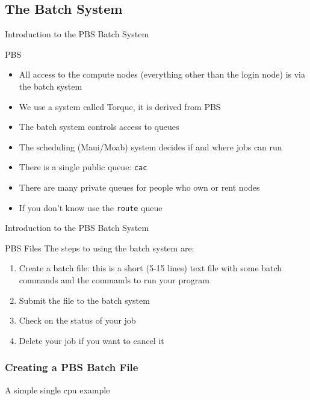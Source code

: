 \documentclass{beamer}
\begin{document}
  \subsection{The Batch System}
  \begin{frame}{Introduction to the PBS Batch System}
   \begin{block}{PBS}
    \begin{itemize}
    \item All access to the compute nodes (everything other than the login node)
      is via the batch system
    \item We use a system called Torque, it is derived from PBS
    \item The batch system controls access to queues
    \item The scheduling (Maui/Moab) system decides if and where jobs can run
    \item<2-> There is a single public queue: \texttt{cac}
    \item<2-> There are many private queues for people who own or rent nodes
    \item<2-> If you don't know use the \texttt{route} queue
    \end{itemize}
   \end{block}
  \end{frame}
  \begin{frame}{Introduction to the PBS Batch System}
   \begin{block}{PBS Files}
    The steps to using the batch system are:
    \begin{enumerate}
    \item Create a batch file: this is a short (5-15 lines) text file with some
      batch commands and the commands to run your program
    \item Submit the file to the batch system
    \item Check on the status of your job
    \item Delete your job if you want to cancel it
    \end{enumerate}
   \end{block}
  \end{frame}
\begin{frame}[fragile]
  \frametitle{Creating a PBS Batch File}
A simple single cpu example
  \begin{semiverbatim}
  \end{semiverbatim}
\end{frame}
\end{document}
